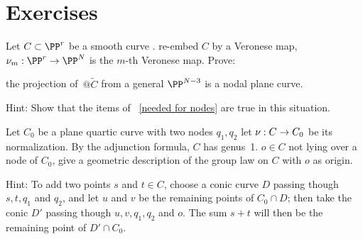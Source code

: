 \section{Exercises}

\begin{exercise}
Let $C\subset \PP^r$ be a smooth curve 
. 
re-embed $C$ by a
Veronese map,
$\nu_m :
\PP^r \to \PP^N$ is the $m$-th Veronese map. Prove:

\begin{proposition}
\label{positive characteristic nodes}
the projection of~$@\widetilde C$ from a general $\PP^{N-3}$
is a nodal
plane curve.
\unif
\end{proposition}

Hint: Show that the items of~
\ref{needed for nodes}  are true in this
situation.
\end{exercise}

\begin{exercise}
Let $C_0$ be a plane quartic curve with two nodes $q_1, q_2$
let $\nu :\nobreak C \to C_0$ be its normalization. 
By the adjunction formula, $C$ has genus~1.
$o \in C$ not
lying over a node of $C_0$,
 give a geometric description
of the group law on $C$ with $o$ as origin.

Hint: To add two points $s$ and $t \in C$, choose a conic curve $D$
passing though $s, t, q_1$ and $q_2$, and let $u$ and $v$ be the remaining
points of $C_0 \cap D$; then take the conic 
$D'$ passing though $u, v,
q_1, q_2$ and $o$. The sum $s+t$ will then be the remaining point of $D'
\cap C_0$.
\end{exercise}

